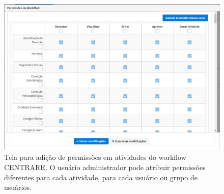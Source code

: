 \begin{figure}
    \centering
    \includegraphics[width=\textwidth]{imgs/Flux/Permissoes/telaPermissoeAstividadesCENTRARE.png}
    \caption{Tela para adição de permissões em atividades do workflow CENTRARE. O usuário administrador pode atribuir permissões diferentes para cada atividade, para cada usuário ou grupo de usuários.}
    \label{fig:permission_activity_interface}
\end{figure}